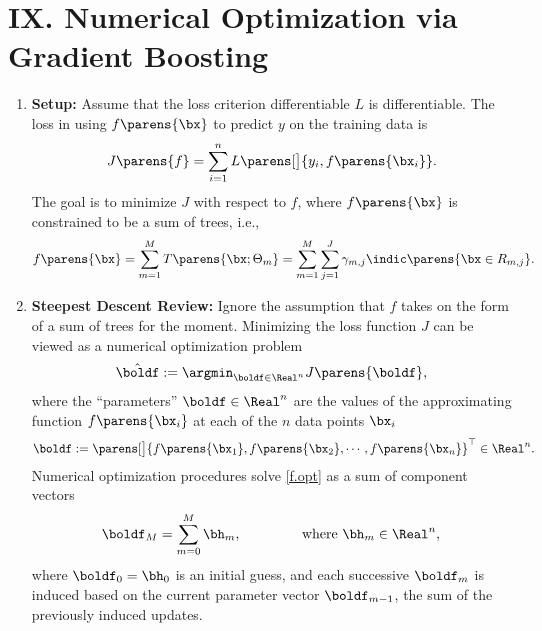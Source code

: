 \documentclass[12pt]{article}
\begin{document}
\section*{IX. Numerical Optimization via Gradient Boosting}

\begin{enumerate}[label=\textbf{\arabic*.}]

	\item \textbf{Setup:} Assume that the loss criterion differentiable $L$ is differentiable. The loss in using $f \parens{\bx}$ to predict $y$ on the training data is 
	\begin{align*}
		J \parens{f} = \sum_{i=1}^n L \parens[\big]{y_i, f \parens{\bx_i}}. 
	\end{align*}
	The goal is to minimize $J$ with respect to $f$, where $f \parens{\bx}$ is constrained to be a sum of trees, i.e., 
	\begin{align*}
		f \parens{\bx} = \sum_{m=1}^M T \parens{\bx; \Theta_{m}} = \sum_{m=1}^M \sum_{j=1}^J \gamma_{m, j} \indic \parens{\bx \in R_{m, j}}. 
	\end{align*}
	
	\item \textbf{Steepest Descent Review:} Ignore the assumption that $f$ takes on the form of a sum of trees for the moment. Minimizing the loss function $J$ can be viewed as a numerical optimization problem 
	\begin{align}\label{f.opt}
		\hat{\boldf} := \argmin_{\boldf \in \Real^n} J \parens{\boldf}, 
	\end{align}
	where the ``parameters'' $\boldf \in \Real^n$ are the values of the approximating function $f \parens{\bx_i}$ at each of the $n$ data points $\bx_i$ 
	\begin{align*}
		\boldf := \parens[\big]{f \parens{\bx_1}, f \parens{\bx_2}, \cdots, f \parens{\bx_n}}^\top \in \Real^n. 
	\end{align*}
	Numerical optimization procedures solve \eqref{f.opt} as a sum of component vectors 
	\begin{align*}
		\boldf_M = \sum_{m = 0}^M \bh_m, \qquad \qquad \text{ where } \bh_m \in \Real^n, 
	\end{align*}
	where $\boldf_0 = \bh_0$ is an initial guess, and each successive $\boldf_m$ is induced based on the current parameter vector $\boldf_{m-1}$, the sum of the previously induced updates. 
	

\end{enumerate}
\end{document}
